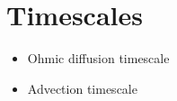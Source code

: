 \section{Timescales}
\label{time}

\begin{itemize}
\item Ohmic diffusion timescale
\item Advection timescale 
\end{itemize}